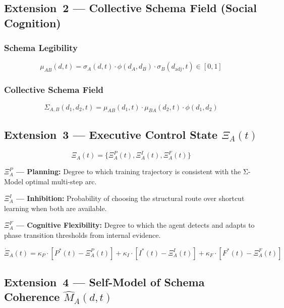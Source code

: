 \documentclass[11pt,a4paper]{article}
\begin{document}
\subsection{Extension~2 --- Collective Schema Field (Social Cognition)}\label{sec:social}

\subsubsection{Schema Legibility}
\begin{equation}\label{eq:schema-legibility}
\mu_{AB}(d,t) = \sigma_A(d,t) \cdot \phi(d_A, d_B) \cdot \sigma_B(d_{\text{adj}},t) \in [0,1]
\end{equation}

\subsubsection{Collective Schema Field}
\begin{equation}\label{eq:collective-field}
\Sigma_{A,B}(d_1,d_2,t) = \mu_{AB}(d_1,t) \cdot \mu_{BA}(d_2,t) \cdot \phi(d_1,d_2)
\end{equation}

\subsection{Extension~3 --- Executive Control State \texorpdfstring{$\Xi_A(t)$}{Xi\_A(t)}}\label{sec:executive}

\begin{equation}\label{eq:executive-state}
\Xi_A(t) = \{\Xi_A^P(t), \Xi_A^I(t), \Xi_A^F(t)\}
\end{equation}

\textbf{$\Xi_A^P$ --- Planning:} Degree to which training trajectory is
consistent with the Σ-Model optimal multi-step arc.

\textbf{$\Xi_A^I$ --- Inhibition:} Probability of choosing the structural
route over shortcut learning when both are available.

\textbf{$\Xi_A^F$ --- Cognitive Flexibility:} Degree to which the agent
detects and adapts to phase transition thresholds from internal evidence.

\begin{equation}\label{eq:executive-ode}
\dot{\Xi}_A(t) = \kappa_P \cdot [P^*(t) - \Xi_A^P(t)] + \kappa_I \cdot [I^*(t) - \Xi_A^I(t)] + \kappa_F \cdot [F^*(t) - \Xi_A^F(t)]
\end{equation}

\subsection{Extension~4 --- Self-Model of Schema Coherence \texorpdfstring{$\hat{M}_A(d,t)$}{M-hat\_A(d,t)}}\label{sec:metacognition}
\end{document}
